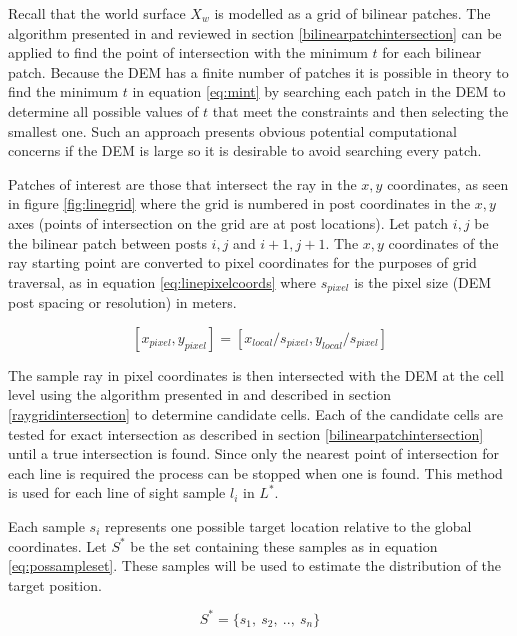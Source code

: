 \documentclass[journal]{IEEEtran}
\begin{document}
Recall that the world surface $X_w$ is modelled as a grid of bilinear patches. The algorithm presented in \cite{ramsey2004ray} and reviewed in section \ref{bilinearpatchintersection} can be applied to find the point of intersection with the minimum $t$ for each bilinear patch. Because the DEM has a finite number of patches it is possible in theory to find the minimum $t$ in equation \ref{eq:mint} by searching each patch in the DEM to determine all possible values of $t$ that meet the constraints and then selecting the smallest one. Such an approach presents obvious potential computational concerns if the DEM is large so it is desirable to avoid searching every patch.

Patches of interest are those that intersect the ray in the $x,y$ coordinates, as seen in figure \ref{fig:linegrid} where the grid is numbered in post coordinates in the $x,y$ axes (points of intersection on the grid are at post locations). Let patch $i,j$ be the bilinear patch between posts $i,j$ and $i+1,j+1$. The $x,y$ coordinates of the ray starting point are converted to pixel coordinates for the purposes of grid traversal, as in equation \ref{eq:linepixelcoords} where $s_{pixel}$ is the pixel size (DEM post spacing or resolution) in meters.

\begin{dmath} \label{eq:linepixelcoords}
    {[x_{pixel}, y_{pixel}] = [x_{local} / s_{pixel}, y_{local} / s_{pixel}]}
\end{dmath}

The sample ray in pixel coordinates is then intersected with the DEM at the cell level using the algorithm presented in \cite{musgrave1988grid} and described in section \ref{raygridintersection} to determine candidate cells. Each of the candidate cells are tested for exact intersection as described in section \ref{bilinearpatchintersection} until a true intersection is found. Since only the nearest point of intersection for each line is required the process can be stopped when one is found. This method is used for each line of sight sample $l_i$ in $L^*$.

Each sample $s_i$ represents one possible target location relative to the global coordinates. Let $S^*$ be the set containing these samples as in equation \ref{eq:possampleset}. These samples will be used to estimate the distribution of the target position.

\begin{dmath} \label{eq:possampleset}
    {S^* = \{ s_1,\ s_2,\ ..,\ s_n\}}
\end{dmath}
\end{document}
